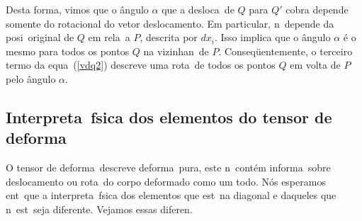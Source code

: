 Desta forma, vimos que o \^angulo $\alpha$ que a desloca\cao\ de $Q$
para $Q'$ cobra depende somente do rotacional do vetor deslocamento. Em
particular, n\ao\ depende da posi\cao\ original de $Q$ em rela\cao\ a
$P$, descrita por $dx_i$. Isso implica que o \^angulo $\alpha$ \'e o
mesmo para todos os pontos $Q$ na vizinhan\ca\ de $P$.
Conseq\"uentemente, o terceiro termo da equa\cao\ (\ref{vdq2}) descreve
uma rota\cao\ de todos os pontos $Q$ em volta de $P$ pelo \^angulo
$\alpha$.

\subsection{Interpreta\cao\ f\ih sica dos elementos do %
tensor de deforma\cao}

O tensor de deforma\cao\ descreve deforma\cao\ pura, este
n\ao\ cont\'em informa\cao\ sobre deslocamento ou
rota\cao\ do corpo deformado como um todo. N\'os esperamos
ent\ao\ que a interpreta\cao\ f\ih sica dos elementos que
est\ao\ na diagonal e daqueles que n\ao\ est\ao\ seja
diferente. Vejamos essas diferen\cas.

